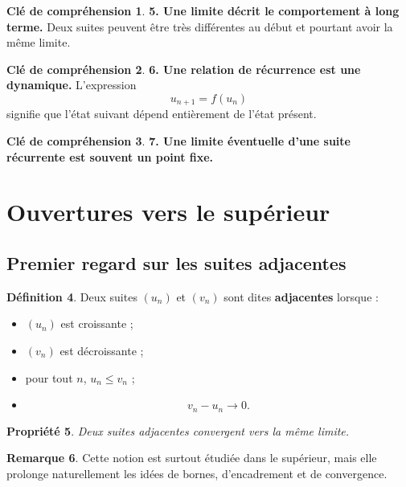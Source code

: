 \documentclass[11pt,a4paper]{article}
\theoremstyle{definition}
\newtheorem{definition}{Définition}[section]
\newtheorem{remarque}[definition]{Remarque}
\newtheorem{interpretation}[definition]{Clé de compréhension}
\theoremstyle{plain}
\newtheorem{propriete}[definition]{Propriété}
\theoremstyle{remark}
\begin{document}
\begin{interpretation}
\textbf{5. Une limite décrit le comportement à long terme.}  
Deux suites peuvent être très différentes au début et pourtant avoir la même limite.
\end{interpretation}

\begin{interpretation}
\textbf{6. Une relation de récurrence est une dynamique.}  
L'expression
\[
u_{n+1}=f(u_n)
\]
signifie que l'état suivant dépend entièrement de l'état présent.
\end{interpretation}

\begin{interpretation}
\textbf{7. Une limite éventuelle d'une suite récurrente est souvent un point fixe.}
\end{interpretation}

\section{Ouvertures vers le supérieur}

\subsection{Premier regard sur les suites adjacentes}

\begin{definition}
Deux suites $(u_n)$ et $(v_n)$ sont dites \textbf{adjacentes} lorsque :
\begin{itemize}[leftmargin=0.8cm]
    \item $(u_n)$ est croissante ;
    \item $(v_n)$ est décroissante ;
    \item pour tout $n$, $u_n\leq v_n$ ;
    \item
    \[
    v_n-u_n\to0.
    \]
\end{itemize}
\end{definition}

\begin{propriete}
Deux suites adjacentes convergent vers la même limite.
\end{propriete}

\begin{remarque}
Cette notion est surtout étudiée dans le supérieur, mais elle prolonge naturellement les idées de bornes, d'encadrement et de convergence.
\end{remarque}
\end{document}
